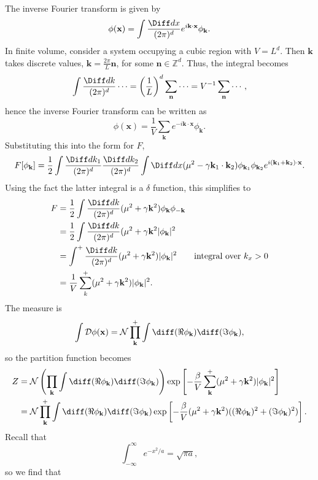 \documentclass[12pt]{article}
\begin{document}
The inverse Fourier transform is given by
\[
\phi(\mathbf{x}) = \int \frac{\Diff d x}{(2 \pi)^d} e^{i \mathbf{k} \cdot \mathbf{x}} \phi_{\mathbf{k}}.
\]
In finite volume, consider a system occupying a cubic region with $V = L^d$. Then $\mathbf{k}$ takes discrete values, $\mathbf{k} = \frac{2\pi}{L} \mathbf{n}$, for some $\mathbf{n} \in \mathbb{Z}^d$. Thus, the integral becomes
\[
\int \frac{\Diff d k}{(2 \pi)^d} \cdots = \left(\frac{1}{L}\right)^d \sum_{\mathbf{n}} \cdots = V^{-1} \sum_{\mathbf{n}} \cdots,
\]
hence the inverse Fourier transform can be written as
\[
\phi(\mathbf{x}) = \frac{1}{V} \sum_{\mathbf{k}} e^{-i \mathbf{k} \cdot \mathbf{x}} \phi_{\mathbf{k}}.
\]
Substituting this into the form for $F$,
\[
	F[\phi_{\mathbf{k}}] = \frac{1}{2} \int \frac{\Diff d k_1}{(2 \pi)^d} \frac{\Diff d k_2}{(2 \pi)^d} \int \Diff d x (\mu^2 - \gamma \mathbf{k}_1 \cdot \mathbf{k}_2) \phi_{ \mathbf{k}_1} \phi_{\mathbf{k}_2} e^{i(\mathbf{k}_1 + \mathbf{k}_2) \cdot \mathbf{x}}.
\]
Using the fact the latter integral is a $\delta$ function, this simplifies to
\begin{align*}
	F &= \frac{1}{2} \int \frac{\Diff d k}{(2 \pi)^d} (\mu^2 + \gamma \mathbf{k}^2) \phi_{\mathbf{k}} \phi_{- \mathbf{k}} \\
	  &= \frac{1}{2} \int \frac{\Diff d k}{(2 \pi)^d} (\mu^2 + \gamma \mathbf{k}^2 |\phi_{\mathbf{k}}|^2 \\
	  &= \int^+ \frac{\Diff d k}{(2 \pi)^d} (\mu^2 + \gamma \mathbf{k}^2) |\phi_{\mathbf{k}}|^2 \qquad \text{integral over } k_x > 0 \\
	  &= \frac{1}{V} \sum^+_k (\mu^2 + \gamma \mathbf{k}^2) |\phi_{\mathbf{k}}|^2.
\end{align*}
The measure is
\[
\int \mathcal{D} \phi(\mathbf{x}) = \mathcal{N} \prod_{\mathbf{k}}^+ \int \diff(\Re \phi_{\mathbf{k}}) \diff(\Im \phi_{\mathbf{k}}),
\]
so the partition function becomes
\begin{align*}
	Z &= \mathcal{N} \left( \prod_{\mathbf{k}} \int \diff (\Re \phi_{\mathbf{k}}) \diff (\Im \phi_{\mathbf{k}}) \right) \exp \left[ - \frac{\beta}{V} \sum^+_{\mathbf{k}} (\mu^2 + \gamma \mathbf{k}^2) |\phi_{\mathbf{k}}|^2 \right] \\
	  &= \mathcal{N} \prod^+_{\mathbf{k}} \int \diff (\Re \phi_{\mathbf{k}}) \diff (\Im \phi_{\mathbf{k}}) \exp \left[ - \frac{\beta}{V} (\mu^2 + \gamma \mathbf{k}^2 ) ((\Re \phi_{\mathbf{k}})^2 + (\Im \phi_{\mathbf{k}})^2) \right].
\end{align*}
Recall that
\[
	\int_{-\infty}^{\infty} e^{-x^2/a} = \sqrt{\pi a},
\]
so we find that
\end{document}
